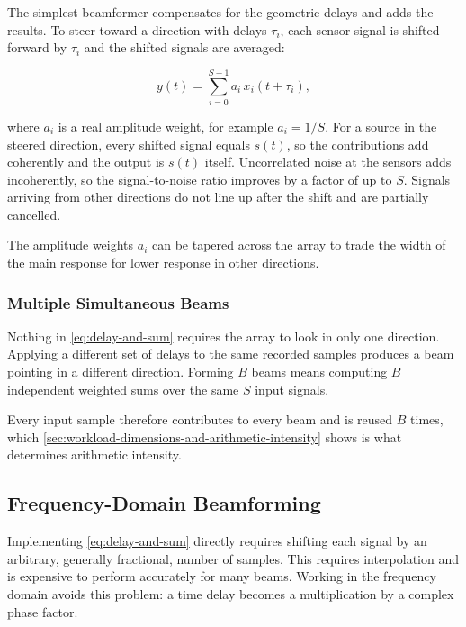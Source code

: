 The simplest beamformer compensates for the geometric delays and adds the results. To steer toward a direction with delays $\tau_i$, each sensor signal is shifted forward by $\tau_i$ and the shifted signals are averaged:

\begin{equation}
  y(t) = \sum_{i=0}^{S-1} a_i \, x_i(t + \tau_i),
  \label{eq:delay-and-sum}
\end{equation}

where $a_i$ is a real amplitude weight, for example $a_i = 1/S$. For a source in the steered direction, every shifted signal equals $s(t)$, so the contributions add coherently and the output is $s(t)$ itself. Uncorrelated noise at the sensors adds incoherently, so the signal-to-noise ratio improves by a factor of up to $S$. Signals arriving from other directions do not line up after the shift and are partially cancelled.

The amplitude weights $a_i$ can be tapered across the array to trade the width of the main response for lower response in other directions.

\subsubsection{Multiple Simultaneous Beams}
\label{sec:multiple-simultaneous-beams}

Nothing in \cref{eq:delay-and-sum} requires the array to look in only one direction. Applying a different set of delays to the same recorded samples produces a beam pointing in a different direction. Forming $B$ beams means computing $B$ independent weighted sums over the same $S$ input signals.

Every input sample therefore contributes to every beam and is reused $B$ times, which \cref{sec:workload-dimensions-and-arithmetic-intensity} shows is what determines arithmetic intensity.

\subsection{Frequency-Domain Beamforming}
\label{sec:frequency-domain-beamforming}

Implementing \cref{eq:delay-and-sum} directly requires shifting each signal by an arbitrary, generally fractional, number of samples. This requires interpolation and is expensive to perform accurately for many beams. Working in the frequency domain avoids this problem: a time delay becomes a multiplication by a complex phase factor.


